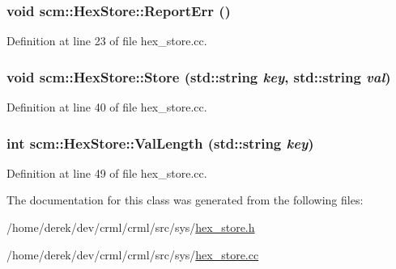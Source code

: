 \hypertarget{classscm_1_1_hex_store_ac98d4c0f37c642e6b45262ec1db62d80}{
\subsubsection[{ReportErr}]{\setlength{\rightskip}{0pt plus 5cm}void scm::HexStore::ReportErr ()}}
\label{classscm_1_1_hex_store_ac98d4c0f37c642e6b45262ec1db62d80}


Definition at line 23 of file hex\_\-store.cc.

\hypertarget{classscm_1_1_hex_store_aa1792118dbb32383976d6906c69c9e71}{
\subsubsection[{Store}]{\setlength{\rightskip}{0pt plus 5cm}void scm::HexStore::Store (std::string {\em key}, \/  std::string {\em val})}}
\label{classscm_1_1_hex_store_aa1792118dbb32383976d6906c69c9e71}


Definition at line 40 of file hex\_\-store.cc.

\hypertarget{classscm_1_1_hex_store_a277a7c2220511ad3c0e447802589def1}{
\subsubsection[{ValLength}]{\setlength{\rightskip}{0pt plus 5cm}int scm::HexStore::ValLength (std::string {\em key})}}
\label{classscm_1_1_hex_store_a277a7c2220511ad3c0e447802589def1}


Definition at line 49 of file hex\_\-store.cc.



The documentation for this class was generated from the following files:\begin{DoxyCompactItemize}
\item 
/home/derek/dev/crml/crml/src/sys/\hyperlink{hex__store_8h}{hex\_\-store.h}\item 
/home/derek/dev/crml/crml/src/sys/\hyperlink{hex__store_8cc}{hex\_\-store.cc}\end{DoxyCompactItemize}
